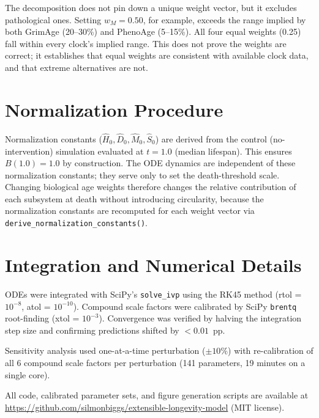 \documentclass[11pt]{article}
\begin{document}
The decomposition does not pin down a unique weight vector, but it excludes pathological ones. Setting $w_M = 0.50$, for example, exceeds the range implied by both GrimAge (20--30\%) and PhenoAge (5--15\%). All four equal weights (0.25) fall within every clock's implied range. This does not prove the weights are correct; it establishes that equal weights are consistent with available clock data, and that extreme alternatives are not.

\section{Normalization Procedure}
\label{sec:normalization}

Normalization constants ($\hat{H}_0, \hat{D}_0, \hat{M}_0, \hat{S}_0$) are derived from the control (no-intervention) simulation evaluated at $t = 1.0$ (median lifespan). This ensures $B(1.0) = 1.0$ by construction. The ODE dynamics are independent of these normalization constants; they serve only to set the death-threshold scale. Changing biological age weights therefore changes the relative contribution of each subsystem at death without introducing circularity, because the normalization constants are recomputed for each weight vector via \texttt{derive\_normalization\_constants()}.

\section{Integration and Numerical Details}
\label{sec:numerics}

ODEs were integrated with SciPy's \texttt{solve\_ivp} using the RK45 method (rtol = $10^{-8}$, atol = $10^{-10}$). Compound scale factors were calibrated by SciPy \texttt{brentq} root-finding (xtol = $10^{-3}$). Convergence was verified by halving the integration step size and confirming predictions shifted by $< 0.01$~pp.

Sensitivity analysis used one-at-a-time perturbation ($\pm 10\%$) with re-calibration of all 6 compound scale factors per perturbation (141 parameters, 19 minutes on a single core).

All code, calibrated parameter sets, and figure generation scripts are available at \url{https://github.com/silmonbiggs/extensible-longevity-model} (MIT license).



\end{document}

